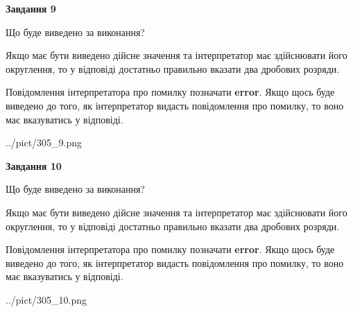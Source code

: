 \documentclass[12pt, ukrainian]{article}
\begin{document}
{\begin {Large}
{\begin {center}\textbf{Завдання 9}\end {center}}\par
Що буде виведено за виконання? \par

Якщо має бути виведено дійсне значення та інтерпретатор має здійснювати його округлення, 
то у відповіді достатньо правильно вказати два дробових розряди.

Повідомлення інтерпретатора про помилку позначати \textbf{error}.
Якщо щось буде виведено до того, як інтерпретатор видасть повідомлення про помилку, 
то воно має вказуватись у відповіді. \par

\begin{center}
	{../pict/305_9.png}
\end{center}
\newpage

{\begin {center}\textbf{Завдання 10}\end {center}}\par
Що буде виведено за виконання? \par

Якщо має бути виведено дійсне значення та інтерпретатор має здійснювати його округлення, 
то у відповіді достатньо правильно вказати два дробових розряди.

Повідомлення інтерпретатора про помилку позначати \textbf{error}.
Якщо щось буде виведено до того, як інтерпретатор видасть повідомлення про помилку, 
то воно має вказуватись у відповіді. \par

\begin{center}
	{../pict/305_10.png}
\end{center}
\newpage

\end {Large}}
\end{document}
